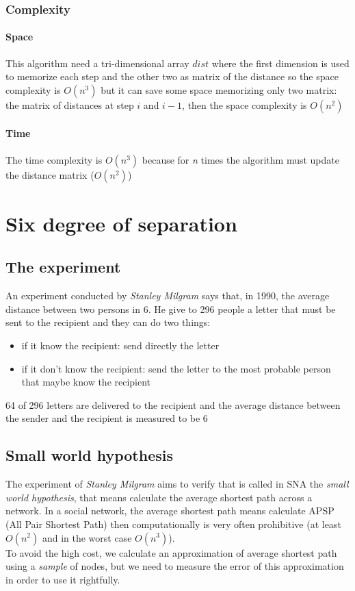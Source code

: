\documentclass[10pt,a4paper]{book}
\begin{document}
	\subsection{Complexity}
	\subsubsection{Space}
	This algorithm need a tri-dimensional array $ dist $ where the first dimension is used to memorize each step and the other two as matrix of the distance so the space complexity is $ O(n^3) $ but it can save some space memorizing only two matrix: the matrix of distances at step $ i $ and $ i-1 $, then the space complexity is $ O(n^2) $
	\subsubsection{Time}
	The time complexity is $ O(n^3) $ because for \textit{n} times the algorithm must update the distance matrix ($ O(n^2) $)
	\chapter{Six degree of separation}
	\section{The experiment}
	An experiment conducted by \textit{Stanley Milgram} says that, in 1990, the average distance between two persons in 6. He give to 296 people a letter that must be sent to the recipient and they can do two things:
	\begin{itemize}
		\item if it know the recipient: send directly the letter
		\item if it don't know the recipient: send the letter to the most probable person that maybe know the recipient
	\end{itemize}
	64 of 296 letters are delivered to the recipient and the average distance between the sender and the recipient is measured to be 6
	\section{Small world hypothesis}
	The experiment of \textit{Stanley Milgram} aims to verify that is called in SNA the \textit{small world hypothesis}, that means calculate the average shortest path across a network. In a social network, the average shortest path means calculate APSP (All Pair Shortest Path) then computationally is very often prohibitive (at least $ O(n^2) $ and in the worst case $ O(n^3) $).\\
	To avoid the high cost, we calculate an approximation of average shortest path using a \textit{sample} of nodes, but we need to measure the error of this approximation in order to use it rightfully.\\
\end{document}
